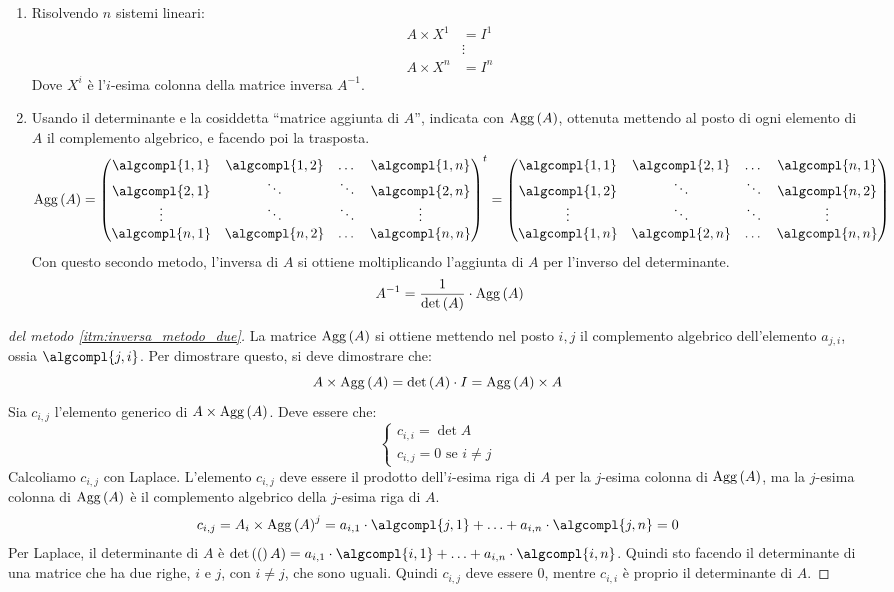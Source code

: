 \begin{enumerate}
    \item Risolvendo $n$ sistemi lineari:
    \begin{align*}
    A \times X^1 &= I^{1} \\
    & \vdots \\
    A \times X^n &= I^n
    \end{align*}
    Dove $X^i$ \`e l'$i$-esima colonna della matrice inversa $A^{-1}$.
    \item\label{itm:inversa_metodo_due} Usando il determinante e la cosiddetta ``matrice aggiunta di $A$'', indicata con $\operatorname{Agg} \left( {A} \right)$, ottenuta mettendo al posto di ogni elemento di $A$ il complemento algebrico, e facendo poi la trasposta.
    \[
    \agg{A} = 
    {\begin{pmatrix}
    \algcompl{1,1} & \algcompl{1,2} & \dots & \algcompl{1,n} \\
    \algcompl{2,1} & \ddots & \ddots & \algcompl{2,n} \\
    \vdots & \ddots & \ddots & \vdots \\
    \algcompl{n,1} & \algcompl{n,2} & \dots & \algcompl{n,n}
    \end{pmatrix}}^t =
    \begin{pmatrix}
    \algcompl{1,1} & \algcompl{2,1} & \dots & \algcompl{n,1} \\
    \algcompl{1,2} & \ddots & \ddots & \algcompl{n,2} \\
    \vdots & \ddots & \ddots & \vdots \\
    \algcompl{1,n} & \algcompl{2,n} & \dots & \algcompl{n,n}
    \end{pmatrix}
    \]
    Con questo secondo metodo, l'inversa di $A$ si ottiene moltiplicando l'aggiunta di $A$ per l'inverso del determinante.
    \[
    A^{-1} = \frac{1}{\operatorname{det} \left({A}\right)} \cdot \operatorname{Agg} \left( {A} \right)
    \]
\end{enumerate}

\begin{proof}[del metodo \ref{itm:inversa_metodo_due}]
La matrice $\operatorname{Agg} \left( {A} \right)$ si ottiene mettendo nel posto $i,j$ il complemento algebrico dell'elemento $a_{j,i}$, ossia $\algcompl{j,i}$. Per dimostrare questo, si deve dimostrare che:
\[
A \times \operatorname{Agg} \left( {A} \right) = \operatorname{det} \left({A}\right) \cdot I = \operatorname{Agg} \left( {A} \right) \times A
\]
Sia $c_{i,j}$ l'elemento generico di $A \times \operatorname{Agg} \left( {A} \right)$. Deve essere che:
\[
\begin{cases}
c_{i,i} = \det{A} \\
c_{i,j} = 0 \text{ se } i \neq j
\end{cases}
\]
Calcoliamo $c_{i,j}$ con Laplace. L'elemento $c_{i,j}$ deve essere il prodotto dell'$i$-esima riga di $A$ per la $j$-esima colonna di $\operatorname{Agg} \left( {A} \right)$, ma la $j$-esima colonna di $\operatorname{Agg} \left( {A} \right)$ \`e il complemento algebrico della $j$-esima riga di $A$.
\[
c_{i,j} = A_i \times \agg{A}^j = 
a_{i,1} \cdot \algcompl{j,1} + \ldots + a_{i, n} \cdot \algcompl{j, n} = 0
\]
Per Laplace, il determinante di $A$ \`e $\det (A) = a_{i,1} \cdot \algcompl{i,1} + \ldots + a_{i,n} \cdot \algcompl{i,n}$. Quindi sto facendo il determinante di una matrice che ha due righe, $i$ e $j$, con $i \neq j$, che sono uguali. Quindi $c_{i,j}$ deve essere 0, mentre $c_{i,i}$ \`e proprio il determinante di $A$.
\end{proof}


